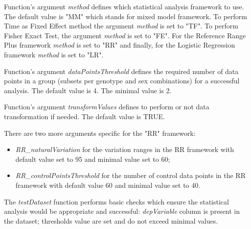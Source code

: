 \documentclass[12pt,a4paper]{article}
\begin{document}
Function's argument \textit{method} defines which statistical analysis framework to use. 
The default value is "MM" which stands for mixed model framework. To perform Time as Fixed Effect method the argument \textit{method} is set to "TF". To perform Fisher Exact Test, the argument \textit{method} is set to "FE". For the Reference Range Plus framework \textit{method} is set to "RR" and finally, for the Logistic Regression framework \textit{method} is set to "LR".

Function's argument \textit{dataPointsThreshold} defines the required number of data points in a group (subsets per genotype and sex combinations) for a successful analysis. The default value is 4. The minimal value is 2.

Function's argument \textit{transformValues} defines to perform or not data transformation if needed. The default value is TRUE.

There are two more arguments specific for the "RR" framework: 
\begin{itemize}
\item \textit{RR\_naturalVariation} for the variation ranges in the RR framework with default value set to 95 and minimal value set to 60; 
\item \textit{RR\_controlPointsThreshold} for the number of control data points in the RR framework with default value 60 and minimal value set to 40.
\end{itemize}

The \textit{testDataset} function performs basic checks which ensure the statistical analysis would be appropriate and successful: \textit{depVariable} column is present in the dataset; thresholds value are set and do not exceed minimal values.
\end{document}
